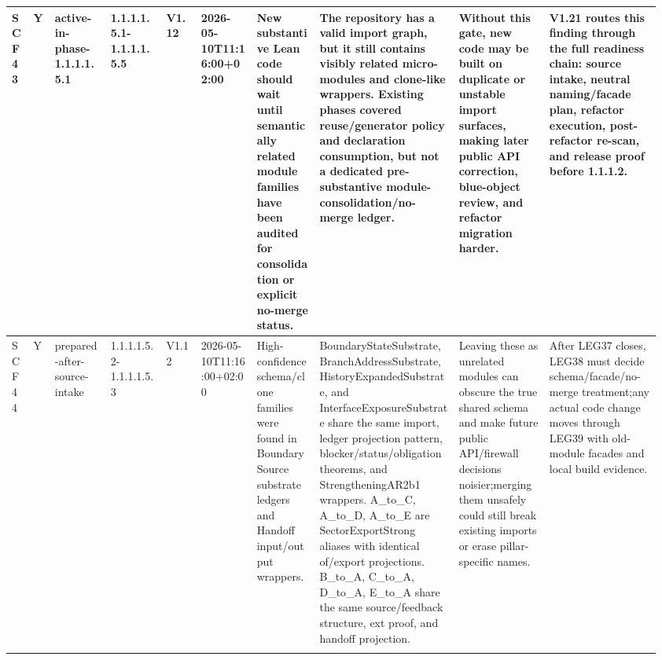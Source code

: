 \begin{longtable}{L{0.03\linewidth} L{0.026\linewidth} L{0.087\linewidth} L{0.085\linewidth} L{0.052\linewidth} L{0.085\linewidth} L{0.095\linewidth} L{0.205\linewidth} L{0.13\linewidth} L{0.165\linewidth}}
\hline
\addlinespace[0.24em]
SCF43 & Y & active-in-phase-1.1.1.1.5.1 & 1.1.1.1.5.1-1.1.1.1.5.5 & V1.12 & 2026-05-10T11:16:00+02:00 & New substantive Lean code should wait until semantically related module families have been audited for consolidation or explicit no-merge status. & The repository has a valid import graph, but it still contains visibly related micro-modules and clone-like wrappers. Existing phases covered reuse/\allowbreak{}generator policy and declaration consumption, but not a dedicated pre-substantive module-consolidation/\allowbreak{}no-merge ledger. & Without this gate, new code may be built on duplicate or unstable import surfaces, making later public API correction, blue-object review, and refactor migration harder. & V1.21 routes this finding through the full readiness chain: source intake, neutral naming/\allowbreak{}facade plan, refactor execution, post-refactor re-scan, and release proof before 1.1.1.2.\\
\hline
\addlinespace[0.24em]
SCF44 & Y & prepared-after-source-intake & 1.1.1.1.5.2-1.1.1.1.5.3 & V1.12 & 2026-05-10T11:16:00+02:00 & High-confidence schema/\allowbreak{}clone families were found in BoundarySource substrate ledgers and Handoff input/\allowbreak{}output wrappers. & BoundaryStateSubstrate, BranchAddressSubstrate, HistoryExpandedSubstrate, and InterfaceExposureSubstrate share the same import, ledger projection pattern, blocker/\allowbreak{}status/\allowbreak{}obligation theorems, and StrengtheningAR2b1 wrappers. A\_to\_C, A\_to\_D, A\_to\_E are SectorExportStrong aliases with identical of/\allowbreak{}export projections. B\_to\_A, C\_to\_A, D\_to\_A, E\_to\_A share the same source/\allowbreak{}feedback structure, ext proof, and handoff projection. & Leaving these as unrelated modules can obscure the true shared schema and make future public API/\allowbreak{}firewall decisions noisier;\newline merging them unsafely could still break existing imports or erase pillar-specific names. & After LEG37 closes, LEG38 must decide schema/\allowbreak{}facade/\allowbreak{}no-merge treatment;\newline any actual code change moves through LEG39 with old-module facades and local build evidence.\\
\hline
\addlinespace[0.24em]

\end{longtable}
